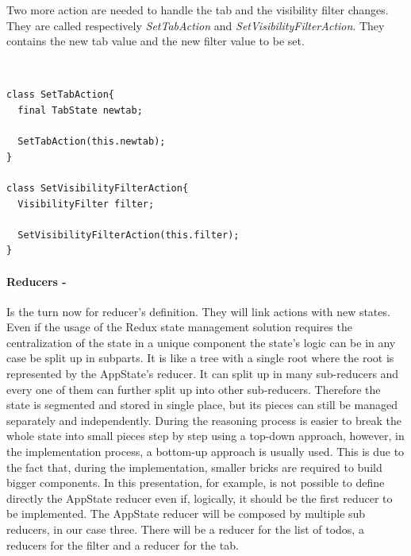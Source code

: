 Two more action are needed to handle the tab and the visibility filter changes. They are called respectively  \textit{SetTabAction} and \textit{SetVisibilityFilterAction}. They contains the new tab value and the new filter value to be set.
\begin{code}
\mbox{}\\
 \mbox{}
		\label{code:2.14}
\begin{verbatim}
class SetTabAction{
  final TabState newtab;

  SetTabAction(this.newtab);
}

class SetVisibilityFilterAction{
  VisibilityFilter filter;

  SetVisibilityFilterAction(this.filter);
}
\end{verbatim}
\mbox{}
\end{code}

\paragraph{Reducers - }
\label{subpar:todo_app_bloc_core_state}
Is the turn now for reducer's definition. They will link actions with new states. Even if the usage of the Redux state management solution requires the centralization of the state in a unique component the state’s logic can be in any case be split up in subparts. It is like a tree with a single root where the root is represented by the AppState's reducer.  It can split up in many sub-reducers and every one of them can further split up into other sub-reducers. Therefore the state is segmented and stored in single place, but its pieces can still be managed separately and independently. During the reasoning process is easier to break the whole state into small pieces step by step using a top-down approach, however, in the implementation process, a bottom-up approach is usually used. This is due to the fact that, during the implementation, smaller bricks are required to build bigger components. In this presentation, for example, is not possible to define directly the AppState reducer even if, logically, it should be the first reducer to be implemented. The AppState reducer will be composed by multiple sub reducers, in our case three. There will be a reducer for the list of todos, a reducers for the filter and a reducer for the tab. 
